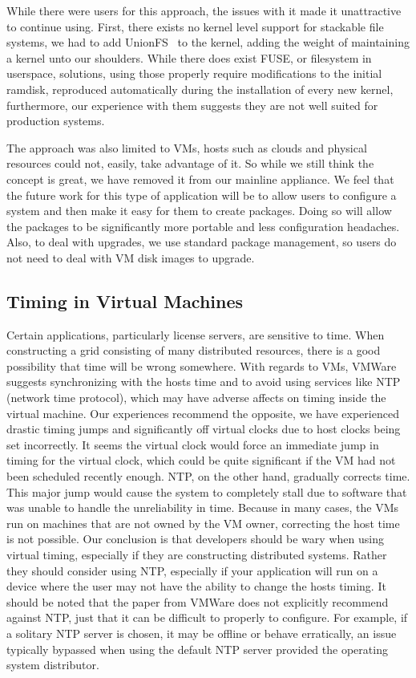 \documentclass[conference]{IEEEtran}
\begin{document}
While there were users for this approach, the issues with it made it
unattractive to continue using.  First, there exists no kernel level support
for stackable file systems, we had to add UnionFS~\cite{unionfs} to the kernel,
adding the weight of maintaining a kernel unto our shoulders.  While there does
exist FUSE, or filesystem in userspace, solutions, using those properly require
modifications to the initial ramdisk, reproduced automatically during the
installation of every new kernel, furthermore, our experience with them
suggests they are not well suited for production systems.

The approach was also limited to VMs, hosts such as clouds and physical
resources could not, easily, take advantage of it.  So while we still think the
concept is great, we have removed it from our mainline appliance.  We feel that
the future work for this type of application will be to allow users to
configure a system and then make it easy for them to create packages.  Doing so
will allow the packages to be significantly more portable and less
configuration headaches.  Also, to deal with upgrades, we use standard package
management, so users do not need to deal with VM disk images to upgrade.

\subsection{Timing in Virtual Machines}


Certain applications, particularly license servers, are sensitive to time.
When constructing a grid consisting of many distributed resources, there is a
good possibility that time will be wrong somewhere.  With regards to VMs,
VMWare~\cite{vmware_timing} suggests synchronizing with the hosts time and to
avoid using services like NTP (network time protocol), which may have adverse
affects on timing inside the virtual machine.  Our experiences recommend the
opposite, we have experienced drastic timing jumps and significantly off
virtual clocks due to host clocks being set incorrectly.  It seems the virtual
clock would force an immediate jump in timing for the virtual clock, which
could be quite significant if the VM had not been scheduled recently enough.
NTP, on the other hand, gradually corrects time.  This major jump would cause
the system to completely stall due to software that was unable to handle the
unreliability in time.  Because in many cases, the VMs run on machines that are
not owned by the VM owner, correcting the host time is not possible.  Our
conclusion is that developers should be wary when using virtual timing,
especially if they are constructing distributed systems.  Rather they should
consider using NTP, especially if your application will run on a device where
the user may not have the ability to change the hosts timing.  It should be
noted that the paper from VMWare does not explicitly recommend against NTP,
just that it can be difficult to properly to configure.  For example, if a
solitary NTP server is chosen, it may be offline or behave erratically, an
issue typically bypassed when using the default NTP server provided the
operating system distributor.
\end{document}
